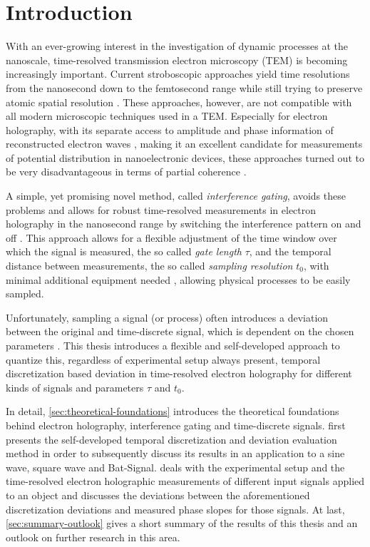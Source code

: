 \section{Introduction} \label{sec:introduction}
With an ever-growing interest in the investigation of dynamic processes at the nanoscale, time-resolved transmission electron microscopy (TEM) is becoming increasingly important. Current stroboscopic approaches yield time resolutions from the nanosecond \cite{Bostanjoglo2000,Doemer2003} down to the femtosecond range \cite{Hassan2017,Zewail2010} while still trying to preserve atomic spatial resolution \cite{Kisielowski2008}. These approaches, however, are not compatible with all modern microscopic techniques used in a TEM. Especially for electron holography, with its separate access to amplitude and phase information of reconstructed electron waves \cite{Lehmann2002,Lichte2007}, making it an excellent candidate for measurements of potential distribution in nanoelectronic devices, these approaches turned out to be very disadvantageous in terms of partial coherence \cite{Feist2017}.

A simple, yet promising novel method, called \emph{interference gating}, avoids these problems and allows for robust time-resolved measurements in electron holography in the nanosecond range by switching the interference pattern on and off \cite{Niermann2017,Wagner2019}. This approach allows for a flexible adjustment of the time window over which the signal is measured, the so called \emph{gate length} $\tau$, and the temporal distance between measurements, the so called \emph{sampling resolution} $t_0$, with minimal additional equipment needed \cite{Niermann2017,Wagner2019}, allowing physical processes to be easily sampled.

Unfortunately, sampling a signal (or process) often introduces a deviation between the original and time-discrete signal, which is dependent on the chosen parameters \cite{Gray1998,Stickler1967,Kobayashi2000}. This thesis introduces a flexible and self-developed approach to quantize this, regardless of experimental setup always present, temporal discretization based deviation in time-resolved electron holography for different kinds of signals and parameters $\tau$ and $t_0$.

In detail, \cref{sec:theoretical-foundations} introduces the theoretical foundations behind electron holography, interference gating and time-discrete signals.  first presents the self-developed temporal discretization and deviation evaluation method in order to subsequently discuss its results in an application to a sine wave, square wave and Bat-Signal.  deals with the experimental setup and the time-resolved electron holographic measurements of different input signals applied to an object and discusses the deviations between the aforementioned discretization deviations and measured phase slopes for those signals. At last, \cref{sec:summary-outlook} gives a short summary of the results of this thesis and an outlook on further research in this area.